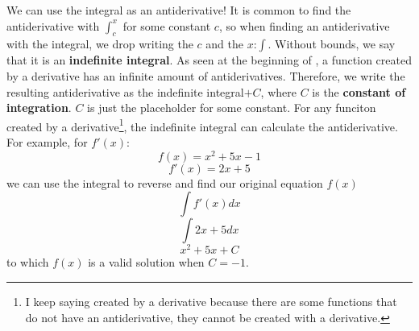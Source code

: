 \documentclass[../revisedmain.tex]{subfiles}
\begin{document}
We can use the integral as an antiderivative! It is common to find the antiderivative with $\int_{c}^{x}$ for some constant $c$, so when finding an antiderivative with the integral, we drop writing the $c$ and the $x$:$\int$. Without bounds, we say that it is an \textbf{indefinite integral}. As seen at the beginning of , a function created by a derivative has an infinite amount of antiderivatives. Therefore, we write the resulting antiderivative as the indefinite integral$+C$, where $C$ is the \textbf{constant of integration}. $C$ is just the placeholder for some constant. For any funciton created by a derivative\footnote{I keep saying created by a derivative because there are some functions that do not have an antiderivative, they cannot be created with a derivative.}, the indefinite integral can calculate the antiderivative. For example, for $f'(x)$:$$f(x)=x^2+5x-1$$$$f'(x)=2x+5$$we can use the integral to reverse and find our original equation $f(x)$$$\int f'(x)dx$$$$\int 2x+5dx$$$$x^2+5x+C$$to which $f(x)$ is a valid solution when $C=-1$.
\end{document}
